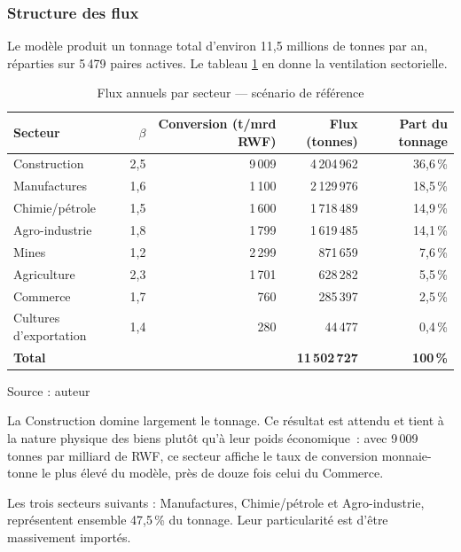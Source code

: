 \documentclass[12pt,a4paper,french]{report}
\begin{document}
	\subsubsection{Structure des flux}

	Le modèle produit un tonnage total d'environ 11,5 millions de tonnes par an, réparties sur 5\,479 paires actives. Le tableau \ref{tab:flux_secteur_ref} en donne la ventilation sectorielle.

	\begin{table}[H]
		\centering
		\caption{Flux annuels par secteur — scénario de référence}
		\label{tab:flux_secteur_ref}
		\begin{tabular}{lrrrr}
			\toprule
			Secteur & $\beta$ & Conversion (t/mrd RWF) & Flux (tonnes) & Part du tonnage \\
			\midrule
			Construction     & 2,5 & 9\,009 & 4\,204\,962 & 36,6\,\% \\
			Manufactures     & 1,6 & 1\,100 & 2\,129\,976 & 18,5\,\% \\
			Chimie/pétrole   & 1,5 & 1\,600 & 1\,718\,489 & 14,9\,\% \\
			Agro-industrie   & 1,8 & 1\,799 & 1\,619\,485 & 14,1\,\% \\
			Mines            & 1,2 & 2\,299 &   871\,659 &  7,6\,\% \\
			Agriculture      & 2,3 & 1\,701 &   628\,282 &  5,5\,\% \\
			Commerce         & 1,7 &   760 &   285\,397 &  2,5\,\% \\
			Cultures d'exportation & 1,4 & 280 & 44\,477 & 0,4\,\% \\
			\midrule
			\textbf{Total}   &     &        & \textbf{11\,502\,727} & \textbf{100\,\%} \\
			\bottomrule
		\end{tabular}

		\vspace{0.3em}
		{\footnotesize Source : auteur}
	\end{table}

	La Construction domine largement le tonnage. Ce résultat est attendu et tient à la nature physique des biens plutôt qu'à leur poids économique~: avec 9\,009 tonnes par milliard de RWF, ce secteur affiche le taux de conversion monnaie-tonne le plus élevé du modèle, près de douze fois celui du Commerce. 

	Les trois secteurs suivants : Manufactures, Chimie/pétrole et Agro-industrie,  représentent ensemble 47,5\,\% du tonnage. Leur particularité est d'être massivement importés.
\end{document}

